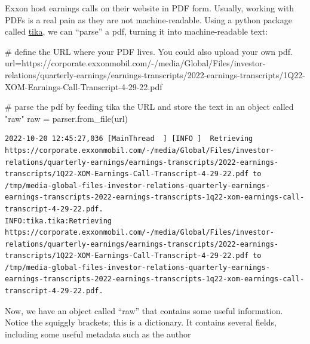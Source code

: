 \documentclass[
  letterpaper,
  DIV=11,
  numbers=noendperiod]{scrreprt}
\newenvironment{Shaded}{\begin{snugshade}}{\end{snugshade}}
\newcommand{\CommentTok}[1]{\textcolor[rgb]{0.37,0.37,0.37}{#1}}
\newcommand{\NormalTok}[1]{\textcolor[rgb]{0.00,0.23,0.31}{#1}}
\newcommand{\OperatorTok}[1]{\textcolor[rgb]{0.37,0.37,0.37}{#1}}
\newcommand{\StringTok}[1]{\textcolor[rgb]{0.13,0.47,0.30}{#1}}
\begin{document}
Exxon host earnings calls on their website in PDF form. Usually, working
with PDFs is a real pain as they are not machine-readable. Using a
python package called
\href{https://www.geeksforgeeks.org/parsing-pdfs-in-python-with-tika/}{tika},
we can ``parse'' a pdf, turning it into machine-readable text:

\begin{Shaded}
\begin{Highlighting}[]
\CommentTok{\# define the URL where your PDF lives. You could also upload your own pdf.}
\NormalTok{url}\OperatorTok{=}\StringTok{\textquotesingle{}https://corporate.exxonmobil.com/{-}/media/Global/Files/investor{-}relations/quarterly{-}earnings/earnings{-}transcripts/2022{-}earnings{-}transcripts/1Q22{-}XOM{-}Earnings{-}Call{-}Transcript{-}4{-}29{-}22.pdf\textquotesingle{}}

\CommentTok{\# parse the pdf by feeding tika the URL and store the text in an object called "raw" }
\NormalTok{raw }\OperatorTok{=}\NormalTok{ parser.from\_file(url)}
\end{Highlighting}
\end{Shaded}

\begin{verbatim}
2022-10-20 12:45:27,036 [MainThread  ] [INFO ]  Retrieving https://corporate.exxonmobil.com/-/media/Global/Files/investor-relations/quarterly-earnings/earnings-transcripts/2022-earnings-transcripts/1Q22-XOM-Earnings-Call-Transcript-4-29-22.pdf to /tmp/media-global-files-investor-relations-quarterly-earnings-earnings-transcripts-2022-earnings-transcripts-1q22-xom-earnings-call-transcript-4-29-22.pdf.
INFO:tika.tika:Retrieving https://corporate.exxonmobil.com/-/media/Global/Files/investor-relations/quarterly-earnings/earnings-transcripts/2022-earnings-transcripts/1Q22-XOM-Earnings-Call-Transcript-4-29-22.pdf to /tmp/media-global-files-investor-relations-quarterly-earnings-earnings-transcripts-2022-earnings-transcripts-1q22-xom-earnings-call-transcript-4-29-22.pdf.
\end{verbatim}

Now, we have an object called ``raw'' that contains some useful
information. Notice the squiggly brackets; this is a dictionary. It
contains several fields, including some useful metadata such as the
author
\end{document}
